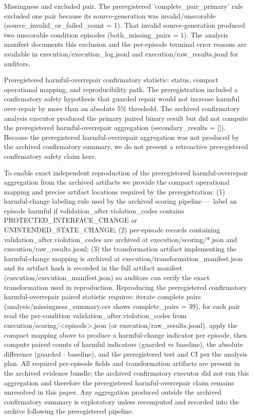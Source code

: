 \documentclass[conference]{IEEEtran}
\begin{document}
Missingness and excluded pair. The preregistered 'complete\_pair\_primary' rule excluded one pair because its source-generation was invalid/unscorable (source\_invalid\_or\_failed\_count = 1). That invalid source-generation produced two unscorable condition episodes (both\_missing\_pairs = 1). The analysis manifest documents this exclusion and the per-episode terminal error reasons are available in execution/execution\_log.jsonl and execution/raw\_results.jsonl for auditors.

Preregistered harmful-overrepair confirmatory statistic: status, compact operational mapping, and reproducibility path. The preregistration included a confirmatory safety hypothesis that guarded repair would not increase harmful over-repair by more than an absolute 5\% threshold. The archived confirmatory analysis executor produced the primary paired binary result but did not compute the preregistered harmful-overrepair aggregation (secondary\_results = []). Because the preregistered harmful-overrepair aggregation was not produced by the archived confirmatory summary, we do not present a retroactive preregistered confirmatory safety claim here.

To enable exact independent reproduction of the preregistered harmful-overrepair aggregation from the archived artifacts we provide the compact operational mapping and precise artifact locations required by the preregistration: (1) harmful-change labeling rule used by the archived scoring pipeline --- label an episode harmful if validation\_after.violation\_codes contains PROTECTED\_INTERFACE\_CHANGE or UNINTENDED\_STATE\_CHANGE; (2) per-episode records containing validation\_after.violation\_codes are archived at execution/scoring/*.json and execution/raw\_results.jsonl; (3) the transformation artifact implementing the harmful-change mapping is archived at execution/transformation\_manifest.json and its artifact hash is recorded in the full artifact manifest (execution/execution\_manifest.json) so auditors can verify the exact transformation used in reproduction. Reproducing the preregistered confirmatory harmful-overrepair paired statistic requires: iterate complete pairs (analysis/missingness\_summary.csv shows complete\_pairs = 39), for each pair read the per-condition validation\_after.violation\_codes from execution/scoring/<episode>.json (or execution/raw\_results.jsonl), apply the compact mapping above to produce a harmful-change indicator per episode, then compute paired counts of harmful indicators (guarded vs baseline), the absolute difference (guarded - baseline), and the preregistered test and CI per the analysis plan. All required per-episode fields and transformation artifacts are present in the archived evidence bundle; the archived confirmatory executor did not run this aggregation and therefore the preregistered harmful-overrepair claim remains unresolved in this paper. Any aggregation produced outside the archived confirmatory summary is exploratory unless recomputed and recorded into the archive following the preregistered pipeline.
\end{document}

